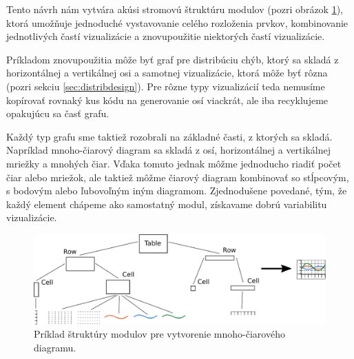 Tento návrh nám vytvára akúsi stromovú štruktúru modulov (pozri obrázok \ref{fig:tree}), ktorá umožňuje jednoduché vystavovanie celého rozloženia prvkov, kombinovanie jednotlivých častí vizualizácie a znovupoužitie niektorých častí vizualizácie. 

Príkladom znovupoužitia môže byť graf pre distribúciu chýb, ktorý sa skladá z horizontálnej a vertikálnej osi a samotnej vizualizácie, ktorá môže byť rôzna (pozri sekciu \ref{sec:distribdesign}). Pre rôzne typy vizualizácií teda nemusíme kopírovať rovnaký kus kódu na generovanie osí viackrát, ale iba recyklujeme opakujúcu sa časť grafu.   

Každý typ grafu sme taktiež rozobrali na základné časti, z ktorých sa skladá. Napríklad mnoho-čiarový diagram sa skladá z osí, horizontálnej a vertikálnej mriežky a mnohých čiar. Vďaka tomuto jednak môžme jednoducho riadiť počet čiar alebo mriežok, ale taktiež môžme čiarový diagram kombinovať so stĺpcovým, s bodovým alebo ľubovoľným iným diagramom. Zjednodušene povedané, tým, že každý element chápeme ako samostatný modul, získavame dobrú variabilitu vizualizácie.

\begin{figure}
	\centering
	\hspace*{-0.2in}
	\includegraphics[width = 6in]{tree}
	\caption{Príklad štruktúry modulov pre vytvorenie mnoho-čiarového diagramu.}
	\label{fig:tree} 
\end{figure}